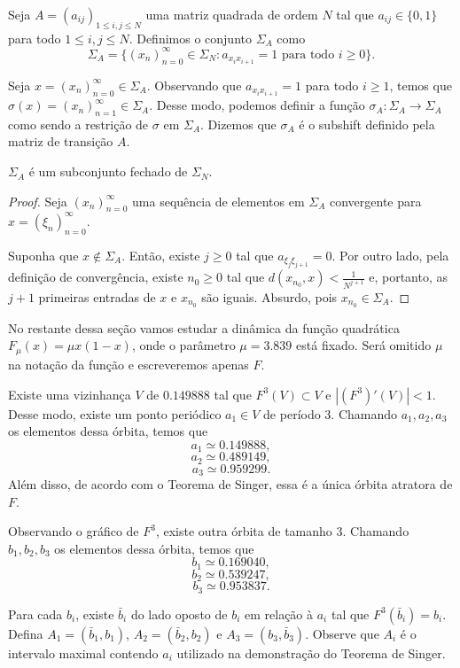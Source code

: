 Seja $A = (a_{ij})_{1 \leq i,j \leq N}$ uma matriz quadrada de ordem $N$ tal que $a_{ij} \in \{ 0, 1 \}$ para todo $1 \leq i,j \leq N$. Definimos o conjunto $\Sigma_A$ como
$$\Sigma_A = \{ (x_n)_{n=0}^{\infty} \in \Sigma_N : a_{x_i x_{i+1}} = 1 \textrm{ para todo } i \geq 0 \}.$$

Seja $x = (x_n)_{n=0}^{\infty} \in \Sigma_A$. Observando que $a_{x_i x_{i+1}} = 1$ para todo $i \geq 1$, temos que $\sigma(x) = (x_n)_{n=1}^\infty \in \Sigma_A$. Desse modo, podemos definir a função $\sigma_A: \Sigma_A \to \Sigma_A$ como sendo a restrição de $\sigma$ em $\Sigma_A$. Dizemos que $\sigma_A$ é o subshift definido pela matriz de transição $A$.

\begin{proposition}
$\Sigma_A$ é um subconjunto fechado de $\Sigma_N$.
\end{proposition}


\begin{proof}
Seja $(x_n)_{n=0}^{\infty}$ uma sequência de elementos em $\Sigma_A$ convergente para $x = (\xi_n)_{n=0}^{\infty}$.

Suponha que $x \notin \Sigma_A$. Então, existe $j \geq 0$ tal que $a_{\xi_j \xi_{j+1}} = 0$. Por outro lado, pela definição de convergência, existe $n_0 \geq 0$ tal que $d(x_{n_0}, x) < \frac{1}{N^{j+1}}$ e, portanto, as $j+1$ primeiras entradas de $x$ e $x_{n_0}$ são iguais. Absurdo, pois $x_{n_0} \in \Sigma_A$.
\end{proof}


No restante dessa seção vamos estudar a dinâmica da função quadrática $F_\mu(x) = \mu x(1-x)$, onde o parâmetro $\mu = 3.839$ está fixado. Será omitido $\mu$ na notação da função e escreveremos apenas $F$.

Existe uma vizinhança $V$ de $0.149888$ tal que $F^3(V) \subset V$ e $|(F^3)'(V)| < 1$. Desse modo, existe um ponto periódico $a_1 \in V$ de período $3$. Chamando $a_1, a_2, a_3$ os elementos dessa órbita, temos que
$$a_1 \simeq 0.149888,$$
$$a_2 \simeq 0.489149,$$
$$a_3 \simeq 0.959299.$$
Além disso, de acordo com o Teorema de Singer, essa é a única órbita atratora de $F$.

Observando o gráfico de $F^3$, existe outra órbita de tamanho $3$. Chamando $b_1, b_2, b_3$ os elementos dessa órbita, temos que
$$b_1 \simeq 0.169040,$$
$$b_2 \simeq 0.539247,$$
$$b_3 \simeq 0.953837.$$

Para cada $b_i$, existe $\bar{b}_i$ do lado oposto de $b_i$ em relação à $a_i$ tal que $F^3(\bar{b}_i) = b_i$. Defina $A_1 = (\bar{b}_1, b_1)$, $A_2 = (\bar{b}_2, b_2)$ e $A_3 = (b_3, \bar{b}_3)$. Observe que $A_i$ é o intervalo maximal contendo $a_i$ utilizado na demonstração do Teorema de Singer.

